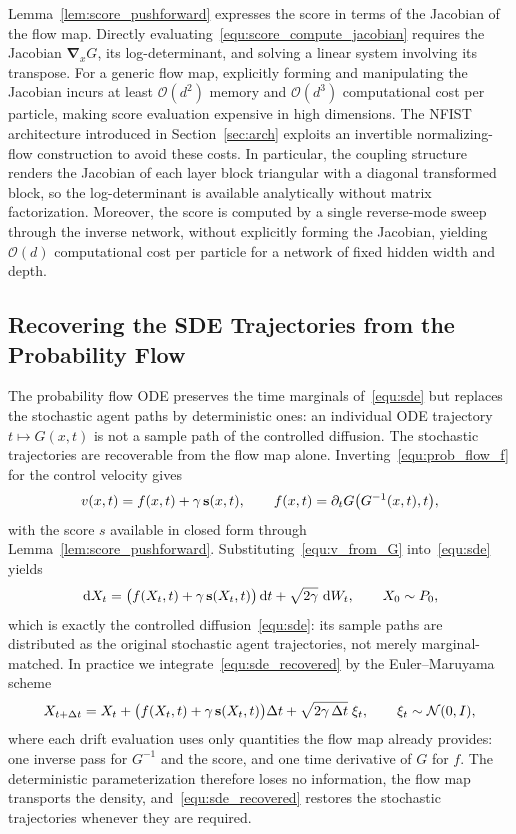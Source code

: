 \documentclass[preprint]{elsarticle}
\newcommand{\dd}{\,\mathrm{d}}          \newcommand{\pdv}[2]{\dfrac{\partial #1}{\partial #2}}
\newcommand{\g}{\gamma}
\newcommand{\sN}{\mathcal{N}}
\newcommand{\inv}{^{-1}}
\begin{document}
Lemma~\ref{lem:score_pushforward} expresses the score in terms of the Jacobian of the flow map. Directly evaluating~\eqref{equ:score_compute_jacobian} requires the Jacobian $\boldsymbol{\nabla}_x G$, its log-determinant, and solving a linear system involving its transpose. For a generic flow map, explicitly forming and manipulating the Jacobian incurs at least $\mathcal{O}(d^2)$ memory and $\mathcal{O}(d^3)$ computational cost per particle, making score evaluation expensive in high dimensions. The NFIST architecture introduced in Section~\ref{sec:arch} exploits an invertible normalizing-flow construction to avoid these costs. In particular, the coupling structure renders the Jacobian of each layer block triangular with a diagonal transformed block, so the log-determinant is available analytically without matrix factorization. Moreover, the score is computed by a single reverse-mode sweep through the inverse network, without explicitly forming the Jacobian, yielding $\mathcal{O}(d)$ computational cost per particle for a network of fixed hidden width and depth.

\subsection{Recovering the SDE Trajectories from the Probability Flow}\label{sec:sde_recovery}
The probability flow ODE preserves the time marginals of~\eqref{equ:sde} but replaces the stochastic agent paths by deterministic ones: an individual ODE trajectory $t\mapsto G(x,t)$ is not a sample path of the controlled diffusion. The stochastic trajectories are recoverable from the flow map alone. Inverting~\eqref{equ:prob_flow_f} for the control velocity gives
\begin{align}
    v(x,t) = f(x,t) + \g\, \mathbf{s}(x,t),
    \qquad
    f(x,t) = \partial_t G\qb{G\inv(x,t),t},
    \label{equ:v_from_G}
\end{align}
with the score $s$ available in closed form through Lemma~\ref{lem:score_pushforward}. Substituting~\eqref{equ:v_from_G} into~\eqref{equ:sde} yields
\begin{align}
    \dd X_t = \qb{f(X_t,t) + \g\, \mathbf{s}(X_t,t)}\dd t + \sqrt{2\g}\,\dd W_t,
    \qquad X_0\sim P_0,
    \label{equ:sde_recovered}
\end{align}
which is exactly the controlled diffusion~\eqref{equ:sde}: its sample paths are distributed as the original stochastic agent trajectories, not merely marginal-matched. In practice we integrate~\eqref{equ:sde_recovered} by the Euler--Maruyama scheme
\begin{align*}
    X_{t+\Delta t} = X_t + \qb{f(X_t,t)+\g\, \mathbf{s}(X_t,t)}\Delta t + \sqrt{2\g\,\Delta t}\;\xi_t,
    \qquad \xi_t\sim\sN(0,I),
\end{align*}
where each drift evaluation uses only quantities the flow map already provides: one inverse pass for $G\inv$ and the score, and one time derivative of $G$ for $f$. The deterministic parameterization therefore loses no information, the flow map transports the density, and~\eqref{equ:sde_recovered} restores the stochastic trajectories whenever they are required.
\end{document}
